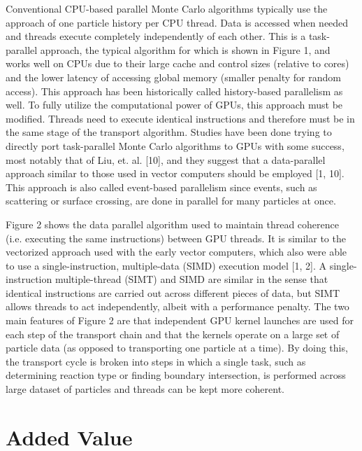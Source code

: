 Conventional CPU-based parallel Monte Carlo algorithms typically use the approach of one particle history per CPU thread.  Data is accessed when needed and threads execute completely independently of each other.  This is a task-parallel approach, the typical algorithm for which is shown in Figure 1, and works well on CPUs due to their large cache and control sizes (relative to cores) and the lower latency of accessing global memory (smaller penalty for random access).  This approach has been historically called history-based parallelism as well.  To fully utilize the computational power of GPUs, this approach must be modified.  Threads need to execute identical instructions and therefore must be in the same stage of the transport algorithm.  Studies have been done trying to directly port task-parallel Monte Carlo algorithms to GPUs with some success, most notably that of Liu, et. al. [10], and they suggest that a data-parallel approach similar to those used in vector computers should be employed [1, 10].  This approach is also called event-based parallelism since events, such as scattering or surface crossing, are done in parallel for many particles at once.

Figure 2 shows the data parallel algorithm used to maintain thread coherence (i.e. executing the same instructions) between GPU threads.  It is similar to the vectorized approach used with the early vector computers, which also were able to use a single-instruction, multiple-data (SIMD) execution model [1, 2].  A single-instruction multiple-thread (SIMT) and SIMD are similar in the sense that identical instructions are carried out across different pieces of data, but SIMT allows threads to act independently, albeit with a performance penalty.   The two main features of Figure 2 are that independent GPU kernel launches are used for each step of the transport chain and that the kernels operate on a large set of particle data (as opposed to transporting one particle at a time).  By doing this, the transport cycle is broken into steps in which a single task, such as determining reaction type or finding boundary intersection, is performed across large dataset of particles and threads can be kept more coherent.

\section{Added Value}

